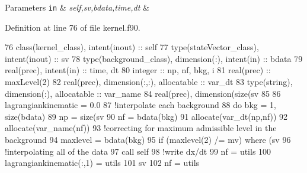 \begin{DoxyParams}[1]{Parameters}
\mbox{\tt in}  & {\em self,sv,bdata,time,dt} & \\
\hline
\end{DoxyParams}


Definition at line 76 of file kernel.\+f90.


\begin{DoxyCode}
76     \textcolor{keywordtype}{class}(kernel\_class), \textcolor{keywordtype}{intent(inout)} :: self
77     \textcolor{keywordtype}{type}(stateVector\_class), \textcolor{keywordtype}{intent(inout)} :: sv
78     \textcolor{keywordtype}{type}(background\_class), \textcolor{keywordtype}{dimension(:)}, \textcolor{keywordtype}{intent(in)} :: bdata
79     \textcolor{keywordtype}{real(prec)}, \textcolor{keywordtype}{intent(in)} :: time, dt
80     \textcolor{keywordtype}{integer} :: np, nf, bkg, i
81     \textcolor{keywordtype}{real(prec)} :: maxLevel(2)
82     \textcolor{keywordtype}{real(prec)}, \textcolor{keywordtype}{dimension(:,:)}, \textcolor{keywordtype}{allocatable} :: var\_dt
83     \textcolor{keywordtype}{type}(string), \textcolor{keywordtype}{dimension(:)}, \textcolor{keywordtype}{allocatable} :: var\_name
84     \textcolor{keywordtype}{real(prec)}, \textcolor{keywordtype}{dimension(size(sv%
85 
86     lagrangiankinematic = 0.0
87     \textcolor{comment}{!interpolate each background}
88     \textcolor{keywordflow}{do} bkg = 1, \textcolor{keyword}{size}(bdata)
89         np = \textcolor{keyword}{size}(sv%
90         nf = bdata(bkg)%
91         \textcolor{keyword}{allocate}(var\_dt(np,nf))
92         \textcolor{keyword}{allocate}(var\_name(nf))
93         \textcolor{comment}{!correcting for maximum admissible level in the background}
94         maxlevel = bdata(bkg)%
95         \textcolor{keywordflow}{if} (maxlevel(2) /= mv) \textcolor{keywordflow}{where} (sv%
96         \textcolor{comment}{!interpolating all of the data}
97         \textcolor{keyword}{call }self%
98         \textcolor{comment}{!write dx/dt}
99         nf = utils%
100         lagrangiankinematic(:,1) = utils%
101         sv%
102         nf = utils%
}
\end{DoxyCode}
